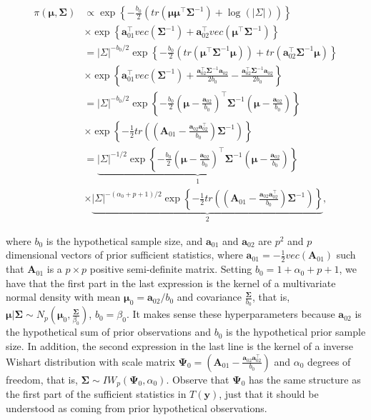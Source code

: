 \begin{enumerate}
\begin{align}
	\pi(\bm{\mu},\bm{\Sigma})&\propto \exp\left\{-\frac{b_0}{2}\left(tr\left(\bm{\mu}\bm{\mu}^{\top}\bm{\Sigma}^{-1}\right)+\log(|\Sigma|)\right)\right\}\nonumber\\
	&\times \exp\left\{\bm{a}_{01}^{\top} vec\left(\bm{\Sigma}^{-1}\right)+\bm{a}_{02}^{\top}vec\left(\bm{\mu}^{\top}\bm{\Sigma}^{-1}\right)\right\}\nonumber\\
	&=|\Sigma|^{-b_0/2}\exp\left\{-\frac{b_0}{2}\left(tr\left(\bm{\mu}^{\top}\bm{\Sigma}^{-1}\bm{\mu}\right)\right)+tr\left(\bm{a}_{02}^{\top}\bm{\Sigma}^{-1}\bm{\mu}\right)\right\}\nonumber\\
	&\times \exp\left\{\bm{a}_{01}^{\top} vec\left(\bm{\Sigma}^{-1}\right)+\frac{\bm{a}_{02}^{\top}\bm{\Sigma}^{-1}\bm{a}_{02}}{2b_0}-\frac{\bm{a}_{02}^{\top}\bm{\Sigma}^{-1}\bm{a}_{02}}{2b_0}\right\}\nonumber\\
	&=|\Sigma|^{-b_0/2}\exp\left\{-\frac{b_0}{2}\left(\bm{\mu}-\frac{\bm{a}_{02}}{b_0}\right)^{\top}\bm{\Sigma}^{-1}\left(\bm{\mu}-\frac{\bm{a}_{02}}{b_0}\right)\right\}\nonumber\\
	&\times \exp\left\{-\frac{1}{2}tr\left(\left(\bm{A}_{01}-\frac{\bm{a}_{02}\bm{a}_{02}^{\top}}{b_0}\right)\bm{\Sigma}^{-1}\right)\right\}\nonumber\\
	&=\underbrace{|\Sigma|^{-1/2}\exp\left\{-\frac{b_0}{2}\left(\bm{\mu}-\frac{\bm{a}_{02}}{b_0}\right)^{\top}\bm{\Sigma}^{-1}\left(\bm{\mu}-\frac{\bm{a}_{02}}{b_0}\right)\right\}}_1\nonumber\\
	&\times \underbrace{|\Sigma|^{-(\alpha_0+p+1)/2}\exp\left\{-\frac{1}{2}tr\left(\left(\bm{A}_{01}-\frac{\bm{a}_{02}\bm{a}_{02}^{\top}}{b_0}\right)\bm{\Sigma}^{-1}\right)\right\}}_2,\nonumber
\end{align}

where $b_0$ is the hypothetical sample size, and $\bm{a}_{01}$ and $\bm{a}_{02}$ are $p^2$ and $p$ dimensional vectors of prior sufficient statistics, where $\bm{a}_{01}=-\frac{1}{2}vec(\bm{A}_{01})$ such that $\bm{A}_{01}$ is a $p\times p$ positive semi-definite matrix. Setting $b_0=1+\alpha_0+p+1$, we have that the first part in the last expression is the kernel of a multivariate normal density with mean $\bm{\mu}_0=\bm{a}_{02}/b_0$ and covariance $\frac{\bm{\Sigma}}{b_0}$, that is, $\bm{\mu}|\bm{\Sigma}\sim N_p\left(\bm{\mu}_0,\frac{\bm{\Sigma}}{\beta_0}\right)$, $b_0=\beta_0$. It makes sense these hyperparameters because $\bm{a}_{02}$ is the hypothetical sum of prior observations and $b_0$ is the hypothetical prior sample size. In addition, the second expression in the last line is the kernel of a inverse Wishart distribution with scale matrix $\bm{\Psi}_0=\left(\bm{A}_{01}-\frac{\bm{a}_{02}\bm{a}_{02}^{\top}}{b_0}\right)$ and $\alpha_0$ degrees of freedom, that is, $\bm{\Sigma}\sim IW_p(\bm{\Psi}_0,\alpha_0)$. Observe that $\bm{\Psi}_0$ has the same structure as the first part of the sufficient statistics in $T(\bm{y})$, just that it should be understood as coming from prior hypothetical observations.


\end{enumerate}
